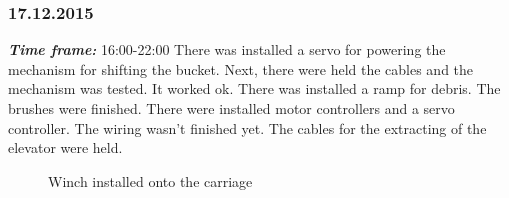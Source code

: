 \subsubsection{17.12.2015}
\textit{\textbf{Time frame:}} 16:00-22:00 \newline
There was installed a servo for powering the mechanism for shifting the bucket. Next, there were held the cables and the mechanism was tested. It worked ok.
There was installed a ramp for debris. The brushes were finished.
There were installed motor controllers and a servo controller. The wiring wasn't finished yet.
The cables for the extracting of the elevator were held.

\begin{figure}[H]
	\begin{minipage}[h]{0.58\linewidth}
		\caption{Winch installed onto the carriage}
	\end{minipage}
	\hfill
	\begin{minipage}[h]{0.37\linewidth}

\end{minipage}
\end{figure}
